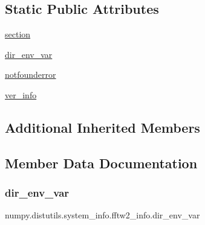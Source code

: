 \subsection*{Static Public Attributes}
\begin{DoxyCompactItemize}
\item 
\hyperlink{classnumpy_1_1distutils_1_1system__info_1_1fftw2__info_abb8c9cab4ec3d42189754b4c5859c7d2}{section}
\item 
\hyperlink{classnumpy_1_1distutils_1_1system__info_1_1fftw2__info_a28278002bd6aac95df931121e2896b1e}{dir\+\_\+env\+\_\+var}
\item 
\hyperlink{classnumpy_1_1distutils_1_1system__info_1_1fftw2__info_a522ac7ff121e4b2cdb79f28dbf5e29a3}{notfounderror}
\item 
\hyperlink{classnumpy_1_1distutils_1_1system__info_1_1fftw2__info_ae8b639a1d9eaaeee5c91dd85551d87f5}{ver\+\_\+info}
\end{DoxyCompactItemize}
\subsection*{Additional Inherited Members}


\subsection{Member Data Documentation}
\mbox{\label{classnumpy_1_1distutils_1_1system__info_1_1fftw2__info_a28278002bd6aac95df931121e2896b1e}} 
\subsubsection{\texorpdfstring{dir\+\_\+env\+\_\+var}{dir\_env\_var}}
{\footnotesize\ttfamily numpy.\+distutils.\+system\+\_\+info.\+fftw2\+\_\+info.\+dir\+\_\+env\+\_\+var\hspace{0.3cm}{\ttfamily [static]}}

\mbox{\label{classnumpy_1_1distutils_1_1system__info_1_1fftw2__info_a522ac7ff121e4b2cdb79f28dbf5e29a3}} 
